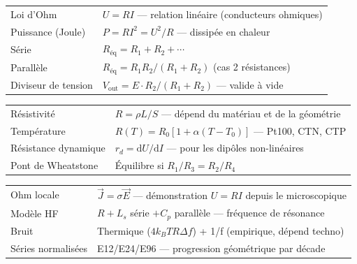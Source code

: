 \documentclass[12pt,a4paper,twoside]{book}
\begin{document}
\begin{bases}[title={\color{white} Résumé --- Les Bases}]
\begin{center}
\renewcommand{\arraystretch}{1.3}
\begin{tabular}{p{4cm}p{9cm}}
\toprule
Loi d'Ohm & $U = RI$ --- relation linéaire (conducteurs ohmiques) \\
Puissance (Joule) & $P = RI^2 = U^2/R$ --- dissipée en chaleur \\
Série & $R_{\text{éq}} = R_1 + R_2 + \cdots$ \\
Parallèle & $R_{\text{éq}} = R_1 R_2 / (R_1 + R_2)$ (cas 2 résistances) \\
Diviseur de tension & $V_{\text{out}} = E \cdot R_2/(R_1+R_2)$ --- valide à vide \\
\bottomrule
\end{tabular}
\end{center}
\end{bases}

\begin{approfondissement}[title={\color{white} Résumé --- Approfondissement}]
\begin{center}
\renewcommand{\arraystretch}{1.3}
\begin{tabular}{p{4cm}p{9cm}}
\toprule
Résistivité & $R = \rho L / S$ --- dépend du matériau et de la géométrie \\
Température & $R(T) = R_0[1+\alpha(T-T_0)]$ --- Pt100, CTN, CTP \\
Résistance dynamique & $r_d = \mathrm{d}U/\mathrm{d}I$ --- pour les dipôles non-linéaires \\
Pont de Wheatstone & Équilibre si $R_1/R_3 = R_2/R_4$ \\
\bottomrule
\end{tabular}
\end{center}
\end{approfondissement}

\begin{ingenieur}[title={\color{white} Résumé --- Niveau Ingénieur}]
\begin{center}
\renewcommand{\arraystretch}{1.3}
\begin{tabular}{p{4cm}p{9cm}}
\toprule
Ohm locale & $\vec{J} = \sigma\vec{E}$ --- démonstration $U = RI$ depuis le microscopique \\
Modèle HF & $R + L_s$ série $+ C_p$ parallèle --- fréquence de résonance \\
Bruit & Thermique ($4k_BTR\Delta f$) + 1/f (empirique, dépend techno) \\
Séries normalisées & E12/E24/E96 --- progression géométrique par décade \\
\bottomrule
\end{tabular}
\end{center}
\end{ingenieur}
\end{document}
